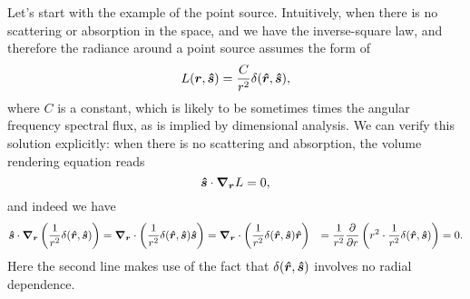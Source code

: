 \documentclass[hyperref, a4paper]{article}
\def\\{}%
\begin{document}
Let's start with the example of the point source.
Intuitively, when there is no scattering or absorption in the space,
and we have the inverse-square law,
and therefore the radiance around a point source assumes the form of 
\begin{equation}
    L(\vb*{r}, \vu*{s}) = \frac{C}{r^2} \delta(\vu*{r}, \vu*{s}),
\end{equation} 
where $C$ is a constant, which is likely to be 
sometimes times the angular frequency spectral flux,
as is implied by dimensional analysis.
We can verify this solution explicitly: 
when there is no scattering and absorption, 
the volume rendering equation reads 
\begin{equation}
    \vu*{s} \cdot \grad_{\vb*{r}} L = 0,
    \label{eq:trivial-bulk-re}
\end{equation}
and indeed we have  
\begin{equation}
    \begin{aligned}
        \vu*{s} \cdot \grad_{\vb*{r}} \left(\frac{1}{r^2} \delta(\vu*{r}, \vu*{s})\right) &= 
        \grad_{\vb*{r}} \cdot \left(
            \frac{1}{r^2} \delta(\vu*{r}, \vu*{s}) \vu*{s}
        \right) 
        = \grad_{\vb*{r}} \cdot \left(
            \frac{1}{r^2} \delta(\vu*{r}, \vu*{s}) \vu*{r}
        \right) \\
        &= \frac{1}{r^2} \pdv{r} \left(
            r^2 \cdot \frac{1}{r^2} \delta(\vu*{r}, \vu*{s})
        \right) = 0.
    \end{aligned}
    \label{eq:inverse-square-is-solution}
\end{equation}
Here the second line makes use of the fact 
that $\delta(\vu*{r}, \vu*{s})$ involves no radial dependence.
\end{document}
